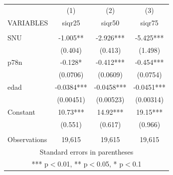 \begin{tabular}{lccc} \hline
 & (1) & (2) & (3) \\
VARIABLES & siqr25 & siqr50 & siqr75 \\ \hline
 &  &  &  \\
SNU & -1.005** & -2.926*** & -5.425*** \\
 & (0.404) & (0.413) & (1.498) \\
p78n & -0.128* & -0.412*** & -0.454*** \\
 & (0.0706) & (0.0609) & (0.0754) \\
edad & -0.0384*** & -0.0458*** & -0.0451*** \\
 & (0.00451) & (0.00523) & (0.00314) \\
Constant & 10.73*** & 14.92*** & 19.15*** \\
 & (0.551) & (0.617) & (0.966) \\
 &  &  &  \\
 Observations & 19,615 & 19,615 & 19,615 \\ \hline
\multicolumn{4}{c}{ Standard errors in parentheses} \\
\multicolumn{4}{c}{ *** p$<$0.01, ** p$<$0.05, * p$<$0.1} \\
\end{tabular}
